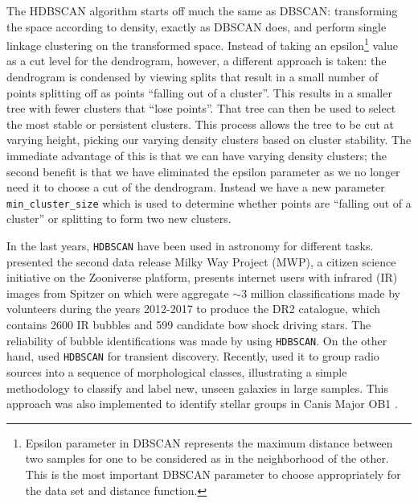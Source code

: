 \documentclass[fleqn,usenatbib]{mnras}
\begin{document}
The {\sc HDBSCAN} algorithm starts off much the same as {\sc DBSCAN}: transforming the space
according to density, exactly as DBSCAN does, and perform single linkage
clustering on the transformed space. Instead of taking an epsilon\footnote{Epsilon parameter in {\sc DBSCAN} 
represents the maximum distance between two samples for one to be considered as in the neighborhood 
of the other. This is the most important {\sc DBSCAN} parameter to choose appropriately for 
the data set and distance function.} value
as a cut level for the dendrogram, however, a different approach is taken:
the dendrogram is condensed by viewing splits that result in a small number
of points splitting off as points ``falling out of a cluster''. This results
in a smaller tree with fewer clusters that ``lose points''. That tree can then
be used to select the most stable or persistent clusters. This process allows
the tree to be cut at varying height, picking our varying density clusters
based on cluster stability. The immediate advantage of this is that we can
have varying density clusters; the second benefit is that we have eliminated
the epsilon parameter as we no longer need it to choose a cut of the dendrogram.
Instead we have a new parameter \texttt{min\_cluster\_size} which is used
to determine whether points are ``falling out of a cluster'' or splitting
to form two new clusters. 



In the last years, \texttt{HDBSCAN} have been used in astronomy for different tasks.
\citet{Jayasinghe:2019} presented the second data release Milky Way Project (MWP), a citizen
science initiative on the Zooniverse platform, presents internet users with infrared (IR)
images from Spitzer on which were aggregate $\sim$3 million classifications made
by volunteers during the years 2012-2017 to produce the DR2 catalogue, which
contains 2600 IR bubbles and 599 candidate bow shock driving stars.
The reliability of bubble identifications was made by using \texttt{HDBSCAN}.
On the other hand, \citet{Webb:2020} used \texttt{HDBSCAN} for transient discovery.
Recently, \citet{Ntwaetsile:2021} used it to group radio sources into a sequence
of morphological classes, illustrating a simple methodology to classify and
label new, unseen galaxies in large samples. This approach was also implemented to 
identify stellar groups in Canis Major OB1 \citep{Santos-Silva:2021}.
\end{document}
